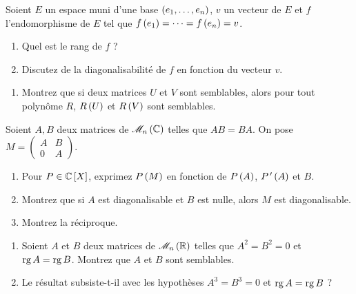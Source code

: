 \begin{exo}
Soient \(E\) un espace muni d'une base \(\left(e_1,\dots,e_n\right)\), \(v\) un vecteur de \(E\) et \(f\) l'endomorphisme de \(E\) tel que \(f\left(e_1\right)=\dots=f\left(e_n\right)=v\).

\begin{enumerate}
    \item Quel est le rang de \(f\) ? \\
    \item Discutez de la diagonalisabilité de \(f\) en fonction du vecteur \(v\).
\end{enumerate}
\end{exo}

\begin{corr}
\end{corr}

\begin{exo}
\begin{enumerate}[series=oral5.15]
    \item Montrez que si deux matrices \(U\) et \(V\) sont semblables, alors pour tout polynôme \(R\), \(R\left(U\right)\) et \(R\left(V\right)\) sont semblables.
\end{enumerate}

Soient \(A,B\) deux matrices de \(\M{n}[\C]\) telles que \(AB=BA\). On pose \(M=\begin{pmatrix}
A & B \\
0 & A
\end{pmatrix}\).

\begin{enumerate}[resume=oral5.15]
    \item Pour \(P\in\poly[\C]\), exprimez \(P\left(M\right)\) en fonction de \(P\left(A\right)\), \(P^{\,\prime}\left(A\right)\) et \(B\). \\
    \item Montrez que si \(A\) est diagonalisable et \(B\) est nulle, alors \(M\) est diagonalisable. \\
    \item Montrez la réciproque.
\end{enumerate}
\end{exo}

\begin{corr}
\end{corr}

\begin{exo}
\begin{enumerate}
    \item Soient \(A\) et \(B\) deux matrices de \(\M{n}[\R]\) telles que \(A^2=B^2=0\) et \(\operatorname{rg} A=\operatorname{rg} B\). Montrez que \(A\) et \(B\) sont semblables. \\
    \item Le résultat subsiste-t-il avec les hypothèses \(A^3=B^3=0\) et \(\operatorname{rg} A=\operatorname{rg} B\) ?
\end{enumerate}
\end{exo}

